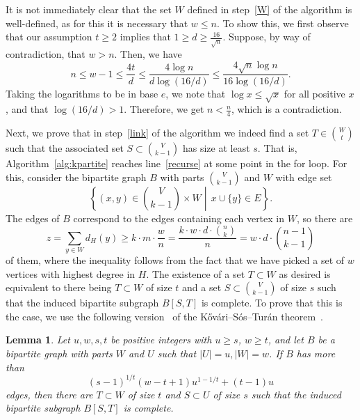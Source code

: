 \documentclass{amsart}
\newtheorem{lemma}[subsection]{Lemma}
\begin{document}
It is not immediately clear that the set $W$ defined in step~\ref{W} of the algorithm
is well-defined, as for this it is necessary that $w \leq n$.
To show this, we first observe that our assumption $t \geq 2$
implies that $ 1 \geq d \geq \frac{16}{\sqrt{n}}$.
Suppose, by way of contradiction, that $w > n$.
Then, we have
\[
    n \leq w - 1 \leq \frac{4t}{d} \leq \frac{4\log n}{d\log(16/d)} \leq \frac{4 \sqrt{n} \log n }{16 \log(16/d)}.
\]
Taking the logarithms to be in base $e$, we note that $\log x \leq \sqrt{x}$ for all positive $x$,
and that $\log(16/d) > 1$.
Therefore, we get $n < \frac{n}{4}$, which is a contradiction.

Next, we prove that in step~\ref{link} of the algorithm
we indeed find a set $T \in \binom{W}{t}$ such that the associated set
$S \subset \binom{V}{k-1}$ has size at least $s$.
That is, Algorithm~\ref{alg:kpartite} reaches line~\ref{recurse} at some point in the for loop.
For this, consider the bipartite graph $B$ with parts $\binom{V}{k-1}$ and $W$ with edge set
\[
  \left\{(x, y) \in \binom{V}{k-1} \times W \middle| \, x \cup \{y\} \in E\right\}.
\]
The edges of $B$ correspond to the edges containing each vertex in $W$, so there are
\[
    z = \sum_{y \in W} d_H(y) \geq k \cdot m \cdot \frac{w}{n} = \frac{k \cdot w \cdot d \cdot \binom{n}{k}}{n} = w \cdot d \cdot \binom{n - 1}{k-1}
\]
of them, where the inequality follows from the fact that we have picked a set of $w$ vertices with highest degree in $H$.
The existence of a set $T \subset W$ as desired is equivalent to there being $T \subset W$ of size $t$ and a set $S \subset \binom{V}{k-1}$ of size $s$
such that the induced bipartite subgraph $B[S, T]$ is complete.
To prove that this is the case,
we use the following version~\cite{Hylten1958} of the K\H{o}v\'{a}ri–S\'{o}s–Tur\'{a}n theorem~\cite{Kovari1954}.

\begin{lemma}\label{thm:kst}
    Let $u, w, s, t$ be positive integers with $u \geq s$, $w \geq t$, and let $B$ be a bipartite graph with parts $W$ and $U$ such that
    $|U| = u, |W| = w$.
    If $B$ has more than \[(s - 1)^{1 / t}(w - t + 1)u^{1 - 1 / t} + (t - 1)u\] edges, then there are
    $T \subset W$ of size $t$ and $S \subset U$ of size $s$ such that the induced bipartite subgraph $B[S, T]$ is complete.
\end{lemma}
\end{document}
